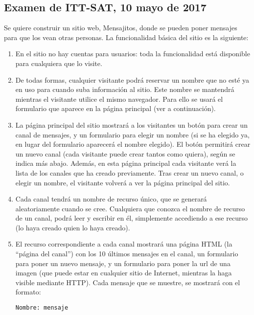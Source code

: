 \subsection{Examen de ITT-SAT, 10 mayo de 2017}

Se quiere construir un sitio web, Mensajitos, donde se pueden poner mensajes para que los vean otras personas. La funcionalidad básica del sitio es la siguiente:

\begin{enumerate}
\item En el sitio no hay cuentas para usuarios: toda la funcionalidad está disponible para cualquiera que lo visite.
\item De todas formas, cualquier visitante podrá reservar un nombre que no esté ya en uso para cuando suba información al sitio. Este nombre se mantendrá mientras el visitante utilice el mismo navegador. Para ello se usará el formulario que aparece en la página principal (ver a continuación).
\item La página principal del sitio mostrará a los visitantes un botón para crear un canal de mensajes, y un formulario para elegir un nombre (si se ha elegido ya, en lugar del formulario aparecerá el nombre elegido). El botón permitirá crear un nuevo canal (cada visitante puede crear tantos como quiera), según se indica más abajo. Además, en esta página principal cada visitante verá la lista de los canales que ha creado previamente. Tras crear un nuevo canal, o elegir un nombre, el visitante volverá a ver la página principal del sitio.
\item Cada canal tendrá un nombre de recurso único, que se generará aleatoriamente cuando se cree. Cualquiera que conozca el nombre de recurso de un canal, podrá leer y escribir en él, simplemente accediendo a ese recurso (lo haya creado quien lo haya creado).
\item El recurso correspondiente a cada canal mostrará una página HTML (la ``página del canal'') con los 10 últimos mensajes en el canal, un formulario para poner un nuevo mensaje, y un formulario para poner la url de una imagen (que puede estar en cualquier sitio de Internet, mientras la haga visible mediante HTTP). Cada mensaje que se muestre, se mostrará con el formato:

\begin{verbatim}
Nombre: mensaje
\end{verbatim}


\end{enumerate}
